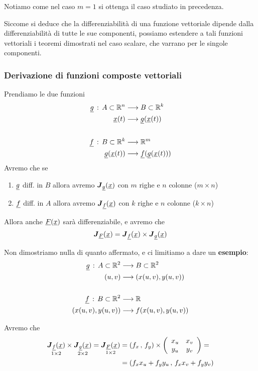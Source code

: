 Notiamo come nel caso $m=1$ si ottenga il caso studiato in precedenza.

Siccome si deduce che la differenziabilità di una funzione vettoriale dipende dalla differenziabilità di tutte le sue componenti, possiamo estendere a tali funzioni vettoriali i teoremi dimostrati nel caso scalare, che varrano per le singole componenti.

\newpage

\subsubsection{Derivazione di funzioni composte vettoriali}

Prendiamo le due funzioni
\begin{align}
	\underline{g} \, : \, A\subset \mathbb{R}^n {}& \longrightarrow B \subset \mathbb{R}^k \\
	\underline{x}(t) & \longrightarrow \underline{g}(\underline{x}(t)) \nonumber \\
	\nonumber \\
	\underline{f} \, : \, B \subset \mathbb{R}^k & \longrightarrow \mathbb{R}^m \\
	\underline{g}(\underline{x}(t)) & \longrightarrow \underline{f}(\underline{g}(\underline{x}(t)))  \nonumber
\end{align}
Avremo che se
\begin{enumerate}
	\item $\underline{g}$ diff. in $B$ allora avremo $\boldsymbol{J}_{\underline{g}} (\underline{x})$ con $m$ righe e $n$ colonne ($m \times n$)
	\item $\underline{f}$ diff. in $A$ allora avremo $\boldsymbol{J}_{\underline{f}} (\underline{x})$ con $k$ righe e $n$ colonne ($k \times n$)
\end{enumerate}
Allora anche $\underline{F}(\underline{x})$ sarà differenziabile, e avremo che 
\begin{align}
	\boldsymbol{J}_{\underline{F}} (\underline{x})= \boldsymbol{J}_{\underline{f}} (\underline{x}) \times \boldsymbol{J}_{\underline{g}} (\underline{x})
\end{align}

Non dimostriamo nulla di quanto affermato, e ci limitiamo a dare un \textbf{esempio}:
\begin{align}
	\underline{g} \, : \, A\subset \mathbb{R}^2 {}& \longrightarrow B \subset \mathbb{R}^2 \quad  \\
	(u,v) &\longrightarrow (x(u,v), y(u,v)) \nonumber \\
	\nonumber \\
	\underline{f} \, : \, B \subset \mathbb{R}^2 & \longrightarrow \mathbb{R} \\
	(x(u,v), y(u,v)) &\longrightarrow f(x(u,v), y(u,v)) \nonumber
\end{align}

Avremo che
\begin{align}
	\underset{1 \times 2}{\boldsymbol{J}_{\underline{f}} (\underline{x})} \times \underset{2 \times 2}{\boldsymbol{J}_{\underline{g}} (\underline{x})} = \underset{1 \times 2}{\boldsymbol{J}_{\underline{F}} (\underline{x})}{}&= (f_x \, , \, f_y)\times \left( \begin{array}{ccc} x_u & x_v \\ y_u & y_v \end{array} \right) = \nonumber \\
	&= (f_x x_u + f_y y_u \, , \, f_x x_v + f_y y_v)
\end{align}

